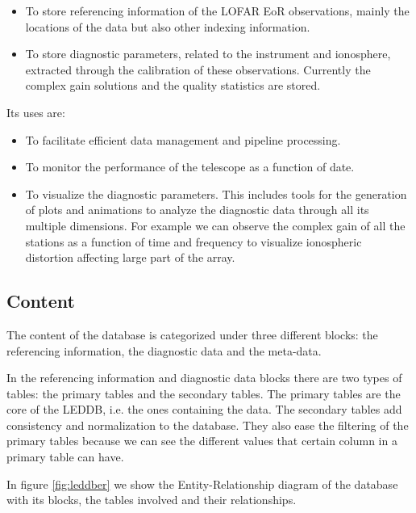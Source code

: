 \documentclass[a4paper,11pt]{article}
\begin{document}
\begin{itemize}
	\item To store referencing information of the LOFAR EoR observations, mainly the locations of the data but also other indexing information.
	
	\item To store diagnostic parameters, related to the instrument and ionosphere, extracted through the calibration of these observations. Currently the complex gain solutions and the quality statistics are stored. 
\end{itemize}

Its uses are:
\begin{itemize}
	\item To facilitate efficient data management and pipeline processing.
	
	\item To monitor the performance of the telescope as a function of date.
	
	\item To visualize the diagnostic parameters. This includes tools for the generation of plots and animations to analyze the diagnostic data through all its multiple dimensions. For example we can observe the complex gain of all the stations as a function of time and frequency to visualize ionospheric distortion affecting large part of the array.
\end{itemize}

\subsection{Content}

The content of the database is categorized under three different blocks: the referencing information, the diagnostic data and the meta-data. 

In the referencing information and diagnostic data blocks there are two types of tables: the primary tables and the secondary tables. The primary tables are the core of the LEDDB, i.e. the ones containing the data. The secondary tables add consistency and normalization to the database. They also ease the filtering of the primary tables because we can see the different values that certain column in a primary table can have.

In figure \ref{fig:leddber} we show the Entity-Relationship diagram of the database with its blocks, the tables involved and their relationships. 
\end{document}
